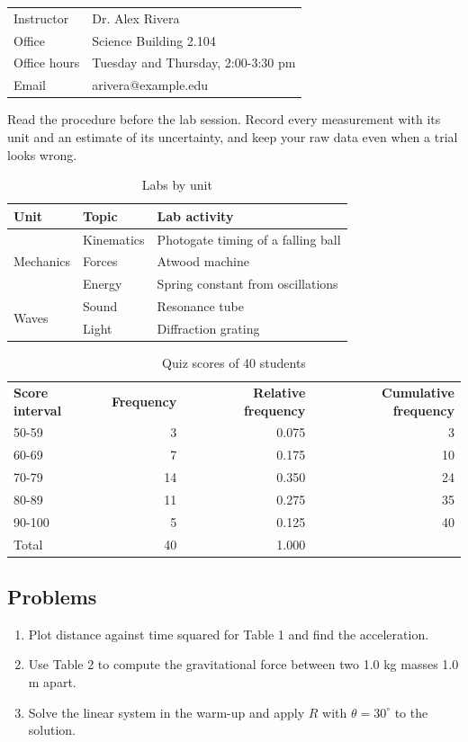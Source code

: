\documentclass[11pt]{article}
\begin{document}
\par\medskip\noindent
\begin{tabular}{@{}ll@{}}
Instructor & Dr. Alex Rivera \\
Office & Science Building 2.104 \\
Office hours & Tuesday and Thursday, 2:00-3:30 pm \\
Email & arivera@example.edu \\
\end{tabular}
\par\medskip

Read the procedure before the lab session. Record every measurement with its unit and an estimate of its uncertainty, and keep your raw data even when a trial looks wrong. 
\begin{table}[H]\centering
\caption{Labs by unit}
\begin{tabular}{|l|l|l|}
\hline
\textbf{Unit} & \textbf{Topic} & \textbf{Lab activity} \\ \hline
\multirow{3}{*}{Mechanics} & Kinematics & Photogate timing of a falling ball \\ \cline{2-3}
 & Forces & Atwood machine \\ \cline{2-3}
 & Energy & Spring constant from oscillations \\ \hline
\multirow{2}{*}{Waves} & Sound & Resonance tube \\ \cline{2-3}
 & Light & Diffraction grating \\ \hline
\end{tabular}
\end{table}

\begin{table}[H]\centering
\caption{Quiz scores of 40 students}

\begin{tabular}{lrrr}
\textbf{Score interval} & \textbf{Frequency} & \textbf{Relative frequency} & \textbf{Cumulative frequency} \\
50-59 & 3 & 0.075 & 3 \\
60-69 & 7 & 0.175 & 10 \\
70-79 & 14 & 0.350 & 24 \\
80-89 & 11 & 0.275 & 35 \\
90-100 & 5 & 0.125 & 40 \\
Total & 40 & 1.000 &  \\
\end{tabular}
\end{table}

\subsection*{Problems}
\begin{enumerate}
\item Plot distance against time squared for Table 1 and find the acceleration.
\item Use Table 2 to compute the gravitational force between two 1.0 kg masses 1.0 m apart.
\item Solve the linear system in the warm-up and apply $R$ with $\theta = 30^\circ$ to the solution.
\end{enumerate}
\end{document}
